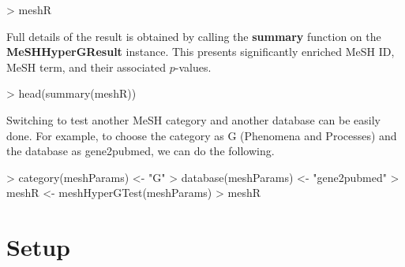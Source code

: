 \documentclass[11pt]{article}
\begin{document}
\begin{center}
\begin{Schunk}
\begin{Sinput}
> meshR
\end{Sinput}
\end{Schunk}
\end{center}

Full details of the result is obtained by calling the \textbf{summary} function on the \textbf{MeSHHyperGResult} instance.
This presents significantly enriched MeSH ID, MeSH term, and their associated $p$-values.

\begin{center}
\begin{Schunk}
\begin{Sinput}
> head(summary(meshR))
\end{Sinput}
\end{Schunk}
\end{center}

Switching to test another MeSH category and another database can be easily done.
For example, to choose the category as G (Phenomena and Processes) and the database as gene2pubmed, we can do the following.

\begin{center}
\begin{Schunk}
\begin{Sinput}
> category(meshParams) <- "G"
> database(meshParams) <- "gene2pubmed"
> meshR <- meshHyperGTest(meshParams)
> meshR
\end{Sinput}
\end{Schunk}
\end{center}

\clearpage
\section{Setup}
\end{document}

